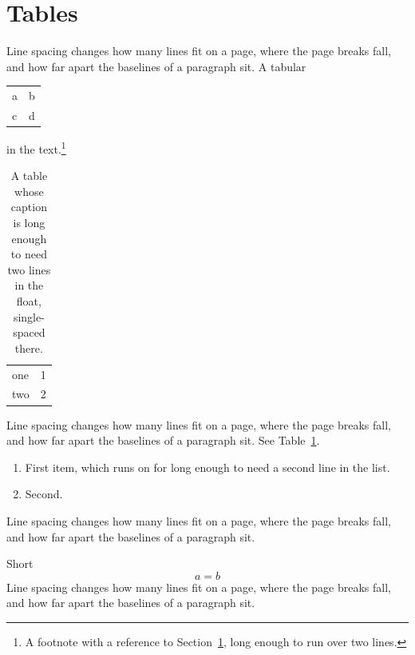 \documentclass[12pt]{article}
\begin{document}
\section{Tables}\label{s}
Line spacing changes how many lines fit on a page, where the page breaks fall, and how far apart the baselines of a paragraph sit. A tabular \begin{tabular}{|l|c|}\hline a & b \\ c & d \\\hline\end{tabular} in the text.\footnote{A footnote with a reference to Section~\ref{s}, long enough to run over two lines.}

\begin{table}[h]
\centering
\begin{tabular}{lr}
one & 1 \\
two & 2 \\
\end{tabular}
\caption{A table whose caption is long enough to need two lines in the float, single-spaced there.}\label{t}
\end{table}
Line spacing changes how many lines fit on a page, where the page breaks fall, and how far apart the baselines of a paragraph sit. See Table~\ref{t}.
\begin{enumerate}
\item First item, which runs on for long enough to need a second line in the list.
\item Second.
\end{enumerate}
\begin{minipage}{0.6\linewidth}
Line spacing changes how many lines fit on a page, where the page breaks fall, and how far apart the baselines of a paragraph sit.
\end{minipage}

Short
\[ a = b \]
Line spacing changes how many lines fit on a page, where the page breaks fall, and how far apart the baselines of a paragraph sit.
\end{document}
